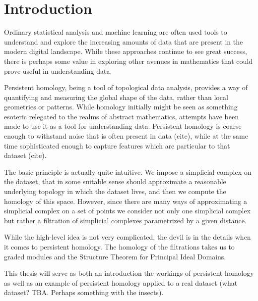 \chapter{Introduction}
Ordinary statistical analysis and machine learning are often used tools to understand and explore the increasing amounts of data that are present in the modern digital landscape. While these approaches continue to see great success, there is perhaps some value in exploring other avenues in mathematics that could prove useful in understanding data.

Persistent homology, being a tool of topological data analysis, provides a way of quantifying and measuring the global shape of the data, rather than local geometries or patterns. While homology initially might be seen as something esoteric relegated to the realms of abstract mathematics, attempts have been made to use it as a tool for understanding data. Persistent homology is coarse enough to withstand noise that is often present in data (cite), while at the same time sophisticated enough to capture features which are particular to that dataset (cite).

The basic principle is actually quite intuitive. We impose a simplicial complex on the dataset, that in some suitable sense should approximate a reasonable underlying topology in which the dataset lives, and then we compute the homology of this space. However, since there are many ways of approximating a simplicial complex on a set of points we consider not only one simplicial complex but rather a filtration of simplicial complexes parametrized by a given distance.

While the high-level idea is not very complicated, the devil is in the details when it comes to persistent homology. The homology of the filtrations takes us to graded modules and the Structure Theorem for Principal Ideal Domains.

This thesis will serve as both an introduction the workings of persistent homology as well as an example of persistent homology applied to a real dataset (what dataset? TBA. Perhaps something with the insects).



